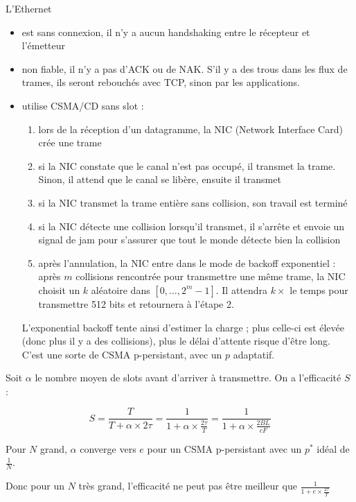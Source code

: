 	L'Ethernet

\begin{itemize}
	\item est sans connexion, il n'y a aucun handshaking entre le récepteur et l'émetteur
	\item non fiable, il n'y a pas d'ACK ou de NAK. S'il y a des trous dans les flux de trames, ils seront rebouchés avec TCP, sinon par les applications.
	\item utilise CSMA/CD sans slot :
	
	\begin{enumerate}
		\item lors de la réception d'un datagramme, la NIC (Network Interface Card) crée une trame
		\item si la NIC  constate que le canal n'est pas occupé, il transmet la trame. Sinon, il attend que le canal se libère, ensuite il transmet
		\item si la NIC transmet la trame entière sans collision, son travail est terminé
		\item si la NIC détecte une collision lorsqu'il transmet, il s'arrête et envoie  un signal de jam pour s'assurer que tout le monde détecte bien la collision
		\item après l'annulation, la NIC entre dans le mode de backoff exponentiel : après $m$ collisions rencontrée pour transmettre une même trame, la NIC choisit un $k$ aléatoire dans $[0, \dots , 2^m - 1]$. Il attendra $k \times $ le temps pour transmettre 512 bits et retournera à l'étape 2. 
	\end{enumerate}
	
	L'exponential backoff tente ainsi d'estimer la charge ; plus celle-ci est élevée (donc plus il y a des collisions), plus le délai d'attente risque d'être long. C'est une sorte de CSMA p-persistant, avec un $p$ adaptatif.
\end{itemize}

	Soit $\alpha$ le nombre moyen de slots avant d'arriver à transmettre. On a l'efficacité $S$ :
	
	$$S = \frac{T}{T + \alpha \times 2 \tau} = \frac{1}{1 + \alpha \times \frac{2 \tau}{T}} = \frac{1}{1 + \alpha \times \frac{2 BL}{cF} }$$
	
	Pour $N$ grand, $\alpha$ converge vers $e$ pour un CSMA p-persistant avec un $p^*$ idéal de $\frac{1}{N}$.
	
	Donc pour un $N$ très grand, l'efficacité ne peut pas être meilleur que $ \frac{1}{1 + e \times \frac{2\tau}{T}} $
	
